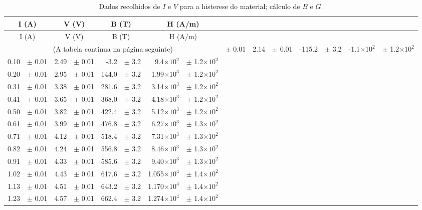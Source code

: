 \documentclass[a4paper]{article}
\begin{document}
\begin{center}
\begin{longtable}[htbp]{rlrlrlrl}
\caption{Dados recolhidos de $I$ e $V$ para a histerese do material; cálculo de $B$ e $G$.} \label{histerese} \\
\hline
\multicolumn{ 2}{c}{I (A)} & \multicolumn{ 2}{c}{V (V)} & \multicolumn{ 2}{c}{B (T)} & \multicolumn{ 2}{c}{H (A/m)} \\ \hline \endfirsthead
\hline
\multicolumn{ 2}{c}{I (A)} & \multicolumn{ 2}{c}{V (V)} & \multicolumn{ 2}{c}{B (T)} & \multicolumn{ 2}{c}{H (A/m)} \\ \hline \endhead
\hline
\multicolumn{8}{c}{(A tabela continua na página seguinte)}
\endfoot
\endlastfoot
0.00 & $\pm$ 0.01 & 2.14 & $\pm$ 0.01 & -115.2 & $\pm$ 3.2 & -1.1$\times 10^{2}$ & $\pm$ 1.2$\times 10^{2}$ \\ 
0.10 & $\pm$ 0.01 & 2.49 & $\pm$ 0.01 & -3.2 & $\pm$ 3.2 & 9.4$\times 10^{2}$ & $\pm$ 1.2$\times 10^{2}$ \\ 
0.20 & $\pm$ 0.01 & 2.95 & $\pm$ 0.01 & 144.0 & $\pm$ 3.2 & 1.99$\times 10^{3}$ & $\pm$ 1.2$\times 10^{2}$ \\ 
0.31 & $\pm$ 0.01 & 3.38 & $\pm$ 0.01 & 281.6 & $\pm$ 3.2 & 3.14$\times 10^{3}$ & $\pm$ 1.2$\times 10^{2}$ \\ 
0.41 & $\pm$ 0.01 & 3.65 & $\pm$ 0.01 & 368.0 & $\pm$ 3.2 & 4.18$\times 10^{3}$ & $\pm$ 1.2$\times 10^{2}$ \\ 
0.50 & $\pm$ 0.01 & 3.82 & $\pm$ 0.01 & 422.4 & $\pm$ 3.2 & 5.12$\times 10^{3}$ & $\pm$ 1.2$\times 10^{2}$ \\ 
0.61 & $\pm$ 0.01 & 3.99 & $\pm$ 0.01 & 476.8 & $\pm$ 3.2 & 6.27$\times 10^{3}$ & $\pm$ 1.3$\times 10^{2}$ \\ 
0.71 & $\pm$ 0.01 & 4.12 & $\pm$ 0.01 & 518.4 & $\pm$ 3.2 & 7.31$\times 10^{3}$ & $\pm$ 1.3$\times 10^{2}$ \\ 
0.82 & $\pm$ 0.01 & 4.24 & $\pm$ 0.01 & 556.8 & $\pm$ 3.2 & 8.46$\times 10^{3}$ & $\pm$ 1.3$\times 10^{2}$ \\ 
0.91 & $\pm$ 0.01 & 4.33 & $\pm$ 0.01 & 585.6 & $\pm$ 3.2 & 9.40$\times 10^{3}$ & $\pm$ 1.3$\times 10^{2}$ \\ 
1.02 & $\pm$ 0.01 & 4.43 & $\pm$ 0.01 & 617.6 & $\pm$ 3.2 & 1.055$\times 10^{4}$ & $\pm$ 1.4$\times 10^{2}$ \\ 
1.13 & $\pm$ 0.01 & 4.51 & $\pm$ 0.01 & 643.2 & $\pm$ 3.2 & 1.170$\times 10^{4}$ & $\pm$ 1.4$\times 10^{2}$ \\ 
1.23 & $\pm$ 0.01 & 4.57 & $\pm$ 0.01 & 662.4 & $\pm$ 3.2 & 1.274$\times 10^{4}$ & $\pm$ 1.4$\times 10^{2}$ \\ 

\end{longtable}
\end{center}
\end{document}
